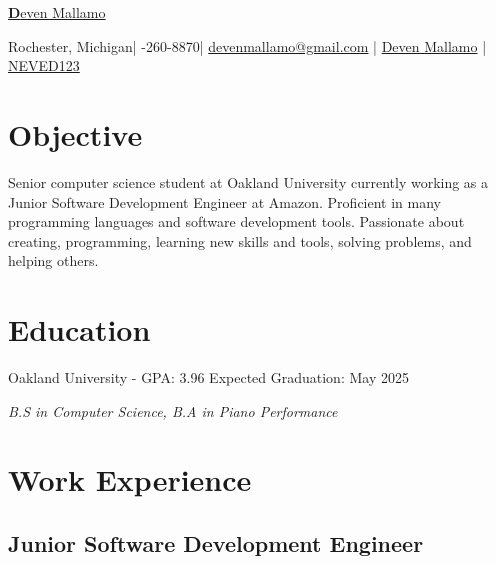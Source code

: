 \documentclass{article}
\makeatletter
\newcommand{\resumesection}[1]{
	\section*{\Large\textbf{#1}}
	\hrulefill
	\vspace{1ex}
}
\newcommand{\name}{Deven Mallamo}
\newcommand{\address}{Rochester, Michigan}
\newcommand{\phone}{586-260-8870}
\newcommand{\email}{devenmallamo@gmail.com}
\newcommand{\linkedin}{Deven Mallamo}
\newcommand{\github}{NEVED123}
\makeatother
\begin{document}
\begin{tcolorbox}[colback= boxfill,colframe=boxframe]
	\begin{center}
		\vspace{5pt}
		\href{https://www.devenmallamo.com}{\Huge \textbf \name} 

		\normalsize \vspace{10pt}

		\faHome \space \address \space | 
		\faPhone \space \phone \space |
		\href{mailto:\email}{\faEnvelope \space \email} \space | 
		\href{https://www.linkedin.com/in/deven-mallamo/}{\faLinkedin \space \linkedin} \space | 
		\href{https://github.com/NEVED123}{\faGithub \space \github} 
	\end{center}
\end{tcolorbox}

\vspace{1ex}

\resumesection{Objective}

\vspace{.2ex}	

Senior computer science student at Oakland University currently working as a Junior Software Development Engineer at Amazon. Proficient in many programming languages and software development tools. Passionate about creating, programming, \hspace{49152sp}learning new skills and tools, solving problems, and helping others.

\vspace{.5ex}	


\resumesection{Education}

\vspace{.2ex}	

Oakland University - GPA: 3.96 \hfill Expected Graduation: May 2025

\textit {B.S in Computer Science, B.\hspace{49152sp}A in Piano Performance} 

\vspace{.5ex}


\resumesection{Work Experience}

\subsection*{Junior Software Development Engineer} 
\end{document}

